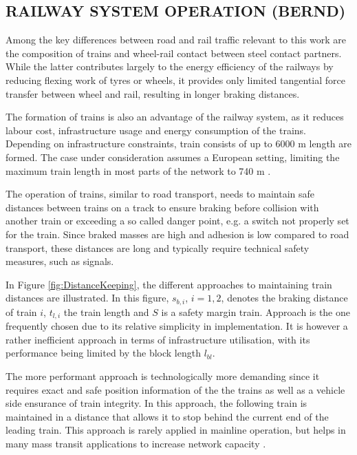 \documentclass[a4paper, 12pt]{scrartcl}
\begin{document}
\subsection{\uppercase{Railway System Operation (Bernd)}}
Among the key differences between road and rail traffic relevant to this work are the composition of trains and wheel-rail contact between steel contact partners. While the latter contributes largely to the energy efficiency of the railways by reducing flexing work of tyres or wheels, it provides only limited tangential force transfer between wheel and rail, resulting in longer braking distances. 

The formation of trains is also an advantage of the railway system, as it reduces labour cost, infrastructure usage and energy consumption of the trains. Depending on infrastructure constraints, train consists of up to 6000 m length are formed. The case under consideration assumes a European setting, limiting the maximum train length in most parts of the network to 740 m \cite{tsiinf}.

The operation of trains, similar to road transport, needs to maintain safe distances between trains on a track to ensure braking before collision with another train or exceeding a so called danger point, e.g. a switch not properly set for the train. Since braked masses are high and adhesion is low compared to road transport, these distances are long and typically require technical safety measures, such as signals.

In Figure \ref{fig:DistanceKeeping}, the different approaches to maintaining train distances are illustrated. In this figure, $s_{b,i}$, $i = 1,2$, denotes the braking distance of train $i$, $t_{l, i}$ the train length and $S$ is a safety margin train. Approach  is the one frequently chosen due to its relative simplicity in implementation. It is however a rather inefficient approach in terms of infrastructure utilisation, with its performance being limited by the block length $l_{bl}$. 

The more performant approach  is technologically more demanding since it requires exact and safe position information of the the trains as well as a vehicle side ensurance of train integrity. In this approach, the following train is maintained in a distance that allows it to stop behind the current end of the leading train. This approach is rarely applied in mainline operation, but helps in many mass transit applications to increase network capacity \cite{pachl2011systemtechnik}. 
\end{document}
